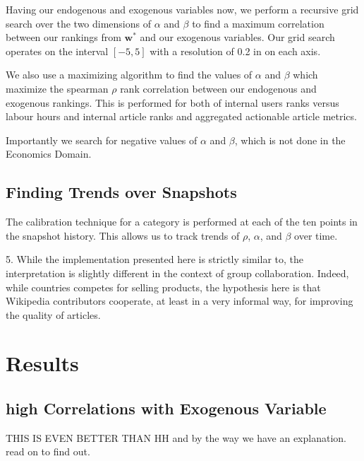 \documentclass{acm_proc_article-sp}
\begin{document}

%
Having our endogenous and exogenous variables now, we perform a recursive grid search over the two dimensions of $\alpha$ and $\beta$ to find a maximum correlation between our rankings from $\mathbf{w^*}$ and our exogenous variables. Our grid search operates on the interval $[-5,5]$ with a resolution of 0.2 in on each axis.


We also use a maximizing algorithm to find the values of $\alpha$ and $\beta$ which maximize the spearman $\rho$ rank correlation between our endogenous and exogenous rankings. This is performed for both of internal users ranks versus labour hours and internal article ranks and aggregated actionable article metrics.

Importantly we search for negative values of $\alpha$ and $\beta$, which is not done in the Economics Domain.

\subsection{Finding Trends over Snapshots}

The calibration technique for a category is performed at each of the ten points in the snapshot history. This allows us to track trends of $\rho$, $\alpha$, and $\beta$ over time.



5. While the implementation presented here is strictly similar to, the interpretation is slightly different in the context of group collaboration. Indeed, while countries competes for selling products, the hypothesis here is that Wikipedia contributors cooperate, at least in a very informal way, for improving the quality of articles.




\section{Results}


\subsection{high Correlations with Exogenous Variable}

THIS IS EVEN BETTER THAN HH
and by the way we have an explanation. read on to find out.
\end{document}
